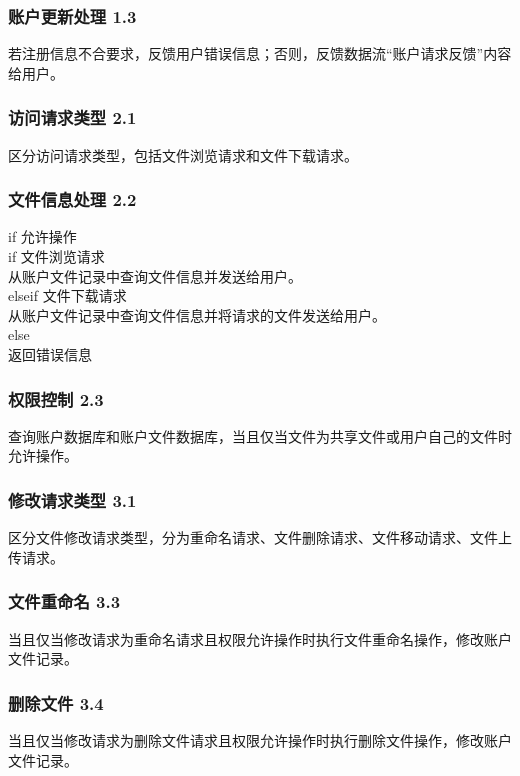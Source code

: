 \subsubsection{账户更新处理 1.3}
若注册信息不合要求，反馈用户错误信息；否则，反馈数据流“账户请求反馈”内容给用户。

\subsubsection{访问请求类型 2.1}
区分访问请求类型，包括文件浏览请求和文件下载请求。

\subsubsection{文件信息处理 2.2}
if 允许操作\\
\hspace*{1.5cm}if 文件浏览请求\\
\hspace*{2cm}从账户文件记录中查询文件信息并发送给用户。\\
\hspace*{1.5cm}elseif 文件下载请求\\
\hspace*{2cm}从账户文件记录中查询文件信息并将请求的文件发送给用户。\\
\hspace*{0.9cm}else\\
\hspace*{1.5cm}返回错误信息\\
	
\subsubsection{权限控制 2.3}
查询账户数据库和账户文件数据库，当且仅当文件为共享文件或用户自己的文件时允许操作。

\subsubsection{修改请求类型 3.1}
区分文件修改请求类型，分为重命名请求、文件删除请求、文件移动请求、文件上传请求。

\subsubsection{文件重命名 3.3}
当且仅当修改请求为重命名请求且权限允许操作时执行文件重命名操作，修改账户文件记录。

\subsubsection{删除文件 3.4}
当且仅当修改请求为删除文件请求且权限允许操作时执行删除文件操作，修改账户文件记录。

